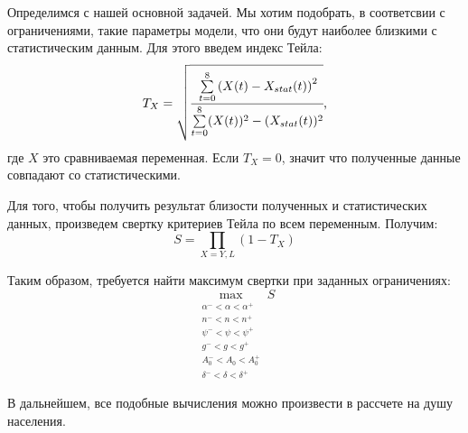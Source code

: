 Определимся с нашей основной задачей.
Мы хотим подобрать, в соответсвии с ограничениями, такие параметры модели, что они будут наиболее близкими с статистическим данным.
Для этого введем индекс Тейла:
\begin{equation*}
	T_{X} = \sqrt{\cfrac{\sum\limits_{t = 0}^{8}\left(X(t) - X_{stat}(t)\right)^2}{\sum\limits_{t = 0}^{8}(X(t))^2 - (X_{stat}(t))^2}}\text{,}
\end{equation*}
где $X$ это сравниваемая переменная.
Если $T_{X} = 0$, значит что полученные данные совпадают со статистическими.

Для того, чтобы получить результат близости полученных и статистических данных, произведем свертку критериев Тейла по всем переменным.
Получим:
\begin{equation*}
S=\prod\limits_{X=Y,L}\left(1 -T_{X}\right)
\end{equation*}

Таким образом, требуется найти максимум свертки при заданных ограничениях:
\begin{equation*}
\max_{\substack{\alpha^- < \alpha < \alpha^+ \\ n^- < n < n^+ \\ \psi^- < \psi < \psi^+ \\ g^- < g < g^+ \\ A_0^- < A_0 < A_0^+ \\ \delta^- < \delta < \delta^+}} S
\end{equation*}

В дальнейшем, все подобные вычисления можно произвести в рассчете на душу населения.
